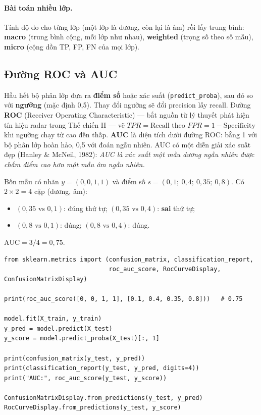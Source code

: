 \paragraph{Bài toán nhiều lớp.} Tính độ đo cho từng lớp (một lớp là dương, còn lại là âm) rồi lấy trung bình: \textbf{macro} (trung bình cộng, mỗi lớp như nhau), \textbf{weighted} (trọng số theo số mẫu), \textbf{micro} (cộng dồn TP, FP, FN của mọi lớp).

\subsection{Đường ROC và AUC}

Hầu hết bộ phân lớp đưa ra \textbf{điểm số} hoặc xác suất (\texttt{predict\_proba}), sau đó so với \textbf{ngưỡng} (mặc định 0,5). Thay đổi ngưỡng sẽ đổi precision lấy recall. Đường \textbf{ROC} (Receiver Operating Characteristic) --- bắt nguồn từ lý thuyết phát hiện tín hiệu radar trong Thế chiến II --- vẽ $TPR = \text{Recall}$ theo $FPR = 1 - \text{Specificity}$ khi ngưỡng chạy từ cao đến thấp. \textbf{AUC} là diện tích dưới đường ROC: bằng 1 với bộ phân lớp hoàn hảo, 0,5 với đoán ngẫu nhiên. AUC có một diễn giải xác suất đẹp (Hanley \& McNeil, 1982): \textit{AUC là xác suất một mẫu dương ngẫu nhiên được chấm điểm cao hơn một mẫu âm ngẫu nhiên.}

\begin{example}
Bốn mẫu có nhãn $y = (0, 0, 1, 1)$ và điểm số $s = (0{,}1;\ 0{,}4;\ 0{,}35;\ 0{,}8)$. Có $2 \times 2 = 4$ cặp (dương, âm):
\begin{itemize}
    \item $(0{,}35 \text{ vs } 0{,}1)$: đúng thứ tự; $(0{,}35 \text{ vs } 0{,}4)$: \textbf{sai} thứ tự;
    \item $(0{,}8 \text{ vs } 0{,}1)$: đúng; $(0{,}8 \text{ vs } 0{,}4)$: đúng.
\end{itemize}
$\text{AUC} = 3/4 = 0{,}75$.
\end{example}

\begin{lstlisting}[caption={Ma trận nhầm lẫn, báo cáo phân lớp và ROC}]
from sklearn.metrics import (confusion_matrix, classification_report,
                             roc_auc_score, RocCurveDisplay, ConfusionMatrixDisplay)

print(roc_auc_score([0, 0, 1, 1], [0.1, 0.4, 0.35, 0.8]))   # 0.75

model.fit(X_train, y_train)
y_pred = model.predict(X_test)
y_score = model.predict_proba(X_test)[:, 1]

print(confusion_matrix(y_test, y_pred))
print(classification_report(y_test, y_pred, digits=4))
print("AUC:", roc_auc_score(y_test, y_score))

ConfusionMatrixDisplay.from_predictions(y_test, y_pred)
RocCurveDisplay.from_predictions(y_test, y_score)
\end{lstlisting}

